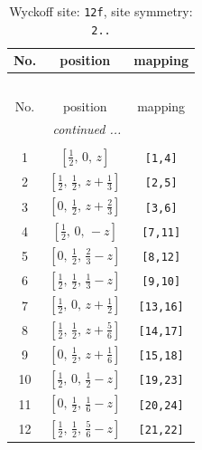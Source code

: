 \documentclass[fleqn,8pt]{jsarticle}
\begin{document}
\begin{longtable}{ccc}
\caption{Wyckoff site: {\tt 12f}, site symmetry: {\tt 2..}}
 \\
 \hline \hline
No. & position & mapping \\ \hline \endfirsthead

\multicolumn{2}{l}{\tablename\ \thetable{}} \\
 \hline \hline
No. & position & mapping \\ \hline \endhead

 \hline \hline
\multicolumn{2}{r}{\footnotesize\it continued ...} \\ \endfoot

 \hline \hline
\multicolumn{2}{r}{} \\ \endlastfoot

1 & $\left[ \frac{1}{2},\, 0,\, z \right]$ & {\tt [1,4]} \\ \hline
2 & $\left[ \frac{1}{2},\, \frac{1}{2},\, z + \frac{1}{3} \right]$ & {\tt [2,5]} \\ \hline
3 & $\left[ 0,\, \frac{1}{2},\, z + \frac{2}{3} \right]$ & {\tt [3,6]} \\ \hline
4 & $\left[ \frac{1}{2},\, 0,\, - z \right]$ & {\tt [7,11]} \\ \hline
5 & $\left[ 0,\, \frac{1}{2},\, \frac{2}{3} - z \right]$ & {\tt [8,12]} \\ \hline
6 & $\left[ \frac{1}{2},\, \frac{1}{2},\, \frac{1}{3} - z \right]$ & {\tt [9,10]} \\ \hline
7 & $\left[ \frac{1}{2},\, 0,\, z + \frac{1}{2} \right]$ & {\tt [13,16]} \\ \hline
8 & $\left[ \frac{1}{2},\, \frac{1}{2},\, z + \frac{5}{6} \right]$ & {\tt [14,17]} \\ \hline
9 & $\left[ 0,\, \frac{1}{2},\, z + \frac{1}{6} \right]$ & {\tt [15,18]} \\ \hline
10 & $\left[ \frac{1}{2},\, 0,\, \frac{1}{2} - z \right]$ & {\tt [19,23]} \\ \hline
11 & $\left[ 0,\, \frac{1}{2},\, \frac{1}{6} - z \right]$ & {\tt [20,24]} \\ \hline
12 & $\left[ \frac{1}{2},\, \frac{1}{2},\, \frac{5}{6} - z \right]$ & {\tt [21,22]} \\
\end{longtable}
\renewcommand{\arraystretch}{1.2}
\end{document}
